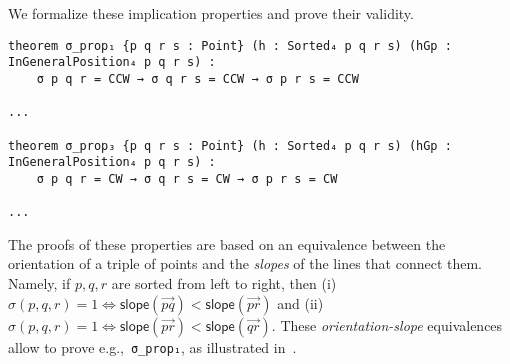 We formalize these implication properties and prove their validity. 
\begin{lstlisting}
theorem σ_prop₁ {p q r s : Point} (h : Sorted₄ p q r s) (hGp : InGeneralPosition₄ p q r s) :
    σ p q r = CCW → σ q r s = CCW → σ p r s = CCW 

...

theorem σ_prop₃ {p q r s : Point} (h : Sorted₄ p q r s) (hGp : InGeneralPosition₄ p q r s) :
    σ p q r = CW → σ q r s = CW → σ p r s = CW 

...
\end{lstlisting}
The proofs of these properties are based on an equivalence between the orientation of a triple of points and the \emph{slopes} of the lines that connect them. Namely, if $p, q, r$  are sorted from left to right, then (i) $\sigma(p,q,r)=1 \iff \textsf{slope}(\vec{pq}) < \textsf{slope}(\vec{pr})$  and (ii) $\sigma(p,q,r)=1 \iff \textsf{slope}(\vec{pr}) < \textsf{slope}(\vec{qr})$. These \emph{orientation-slope} equivalences allow to prove e.g.,~\lstinline|σ_prop₁|, as illustrated in~. 


